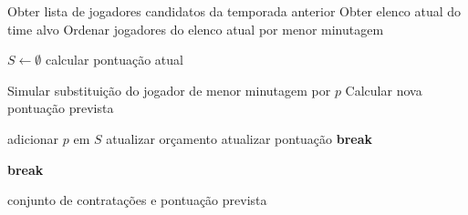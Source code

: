 \begin{algorithm}
\caption{Algoritmo Guloso com estratégia First Improvement}
\begin{algorithmic}

\State Obter lista de jogadores candidatos da temporada anterior
\State Obter elenco atual do time alvo
\State Ordenar jogadores do elenco atual por menor minutagem

\State $S \gets \emptyset$ 
\State calcular pontuação atual

    
        
            \State Simular substituição do jogador de menor minutagem por $p$
            \State Calcular nova pontuação prevista
            
                \State adicionar $p$ em $S$
                \State atualizar orçamento
                \State atualizar pontuação
                \State \textbf{break} 
            \EndIf
            
        \EndIf
        
    \EndFor
    
        \State \textbf{break}
    \EndIf
    
\EndFor

\State \Return conjunto de contratações e pontuação prevista

\end{algorithmic}
\end{algorithm}